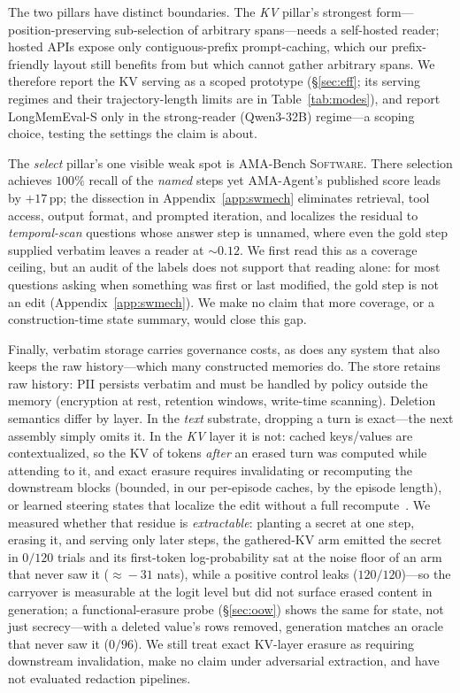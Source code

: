 \documentclass{article} %
\newcommand{\pp}{\,\mathrm{pp}}
\begin{document}
The two pillars have distinct boundaries. The \emph{KV} pillar's strongest
form---position-preserving sub-selection of arbitrary spans---needs a self-hosted
reader; hosted APIs expose only contiguous-prefix prompt-caching, which our
prefix-friendly layout still benefits from but which cannot gather arbitrary
spans. We therefore report the KV serving as a scoped prototype (\S\ref{sec:eff}; its
serving regimes and their trajectory-length limits are in Table~\ref{tab:modes}),
and report LongMemEval-S only in the strong-reader (Qwen3-32B) regime---a scoping
choice, testing the settings the claim is about.

The \emph{select} pillar's one visible weak spot is AMA-Bench \textsc{Software}.
There selection achieves $100\%$ recall of the
\emph{named} steps yet AMA-Agent's published score leads by $+17\pp$; the dissection in
Appendix~\ref{app:swmech} eliminates retrieval, tool access,
output format, and prompted iteration, and localizes the residual to
\emph{temporal-scan} questions whose answer step is unnamed, where even the gold step
supplied verbatim leaves a reader at
$\sim\!0.12$. We first read this as a coverage ceiling, but an audit of the labels
does not support that reading alone: for most questions asking when something was first or
last modified, the gold step is not an edit (Appendix~\ref{app:swmech}). We make no
claim that more coverage, or a construction-time state summary, would close this gap.

Finally, verbatim storage carries governance costs, as does any system that also keeps the raw history---which many constructed memories do.
The store retains raw history: PII persists verbatim and must be handled by
policy outside the memory (encryption at rest, retention windows, write-time
scanning). Deletion semantics differ by layer. In the \emph{text} substrate,
dropping a turn is exact---the next assembly simply omits it. In the \emph{KV}
layer it is not: cached keys/values are contextualized, so the KV of tokens
\emph{after} an erased turn was computed while attending to it, and exact erasure
requires invalidating or recomputing the downstream blocks (bounded, in our
per-episode caches, by the episode length), or learned steering states that localize
the edit without a full recompute~\citep{kveraser}. We measured whether that residue is
\emph{extractable}: planting a secret at one step, erasing it, and serving only
later steps, the gathered-KV arm emitted the secret in $0/120$ trials and its
first-token log-probability sat at the noise floor of an arm that never saw it
($\approx\!-31$ nats), while a positive control leaks ($120/120$)---so the
carryover is measurable at the logit level but did not surface erased content in
generation; a functional-erasure probe (\S\ref{sec:oow}) shows the same for state, not
just secrecy---with a deleted value's rows removed, generation matches an oracle that
never saw it ($0/96$). We still treat exact KV-layer erasure as requiring downstream
invalidation, make no claim under adversarial extraction, and have not evaluated
redaction pipelines.
\end{document}
